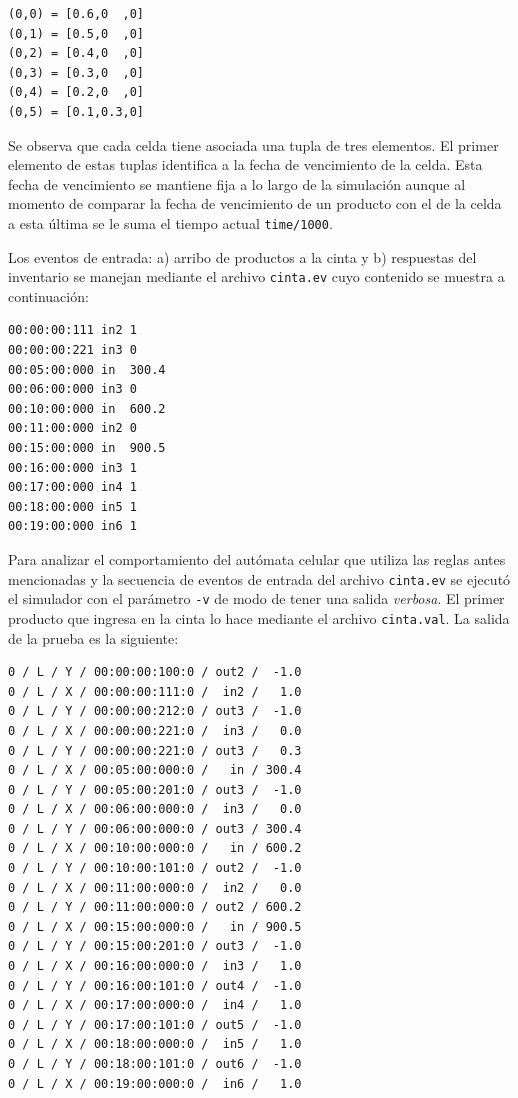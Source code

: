 \documentclass[10pt]{article}
\begin{document}
\begin{minipage}{1\textwidth}
	\centering
	\begin{lstlisting}
(0,0) = [0.6,0  ,0]
(0,1) = [0.5,0  ,0]
(0,2) = [0.4,0  ,0]
(0,3) = [0.3,0  ,0]
(0,4) = [0.2,0  ,0]
(0,5) = [0.1,0.3,0]
	\end{lstlisting}
\end{minipage}

Se observa que cada celda tiene asociada una tupla de tres elementos. El primer elemento de estas tuplas identifica a la fecha de vencimiento de la celda. Esta fecha de vencimiento se mantiene fija a lo largo de la simulación aunque al momento de comparar la fecha de vencimiento de un producto con el de la celda a esta última se le suma el tiempo actual \texttt{time/1000}.

Los eventos de entrada: a) arribo de productos a la cinta y b) respuestas del inventario se manejan mediante el archivo \texttt{cinta.ev} cuyo contenido se muestra a continuación:

\begin{minipage}{1\textwidth}
	\centering
	\begin{lstlisting}
00:00:00:111 in2 1
00:00:00:221 in3 0
00:05:00:000 in  300.4
00:06:00:000 in3 0
00:10:00:000 in  600.2
00:11:00:000 in2 0
00:15:00:000 in  900.5
00:16:00:000 in3 1
00:17:00:000 in4 1
00:18:00:000 in5 1
00:19:00:000 in6 1
	\end{lstlisting}	
\end{minipage}

Para analizar el comportamiento del autómata celular que utiliza las reglas antes mencionadas y la secuencia de eventos de entrada del archivo \texttt{cinta.ev} se ejecutó el simulador con el parámetro \texttt{-v} de modo de tener una salida \textit{verbosa}. El primer producto que ingresa en la cinta lo hace mediante el archivo \texttt{cinta.val}. La salida de la prueba es la siguiente:

\begin{minipage}{1\textwidth}
	\centering
	\begin{lstlisting}
0 / L / Y / 00:00:00:100:0 / out2 /  -1.0 
0 / L / X / 00:00:00:111:0 /  in2 /   1.0 
0 / L / Y / 00:00:00:212:0 / out3 /  -1.0 
0 / L / X / 00:00:00:221:0 /  in3 /   0.0 
0 / L / Y / 00:00:00:221:0 / out3 /   0.3 
0 / L / X / 00:05:00:000:0 /   in / 300.4 
0 / L / Y / 00:05:00:201:0 / out3 /  -1.0 
0 / L / X / 00:06:00:000:0 /  in3 /   0.0 
0 / L / Y / 00:06:00:000:0 / out3 / 300.4 
0 / L / X / 00:10:00:000:0 /   in / 600.2 
0 / L / Y / 00:10:00:101:0 / out2 /  -1.0 
0 / L / X / 00:11:00:000:0 /  in2 /   0.0 
0 / L / Y / 00:11:00:000:0 / out2 / 600.2 
0 / L / X / 00:15:00:000:0 /   in / 900.5 
0 / L / Y / 00:15:00:201:0 / out3 /  -1.0 
0 / L / X / 00:16:00:000:0 /  in3 /   1.0 
0 / L / Y / 00:16:00:101:0 / out4 /  -1.0 
0 / L / X / 00:17:00:000:0 /  in4 /   1.0 
0 / L / Y / 00:17:00:101:0 / out5 /  -1.0 
0 / L / X / 00:18:00:000:0 /  in5 /   1.0 
0 / L / Y / 00:18:00:101:0 / out6 /  -1.0 
0 / L / X / 00:19:00:000:0 /  in6 /   1.0	
	\end{lstlisting}	
\end{minipage}
\end{document}
